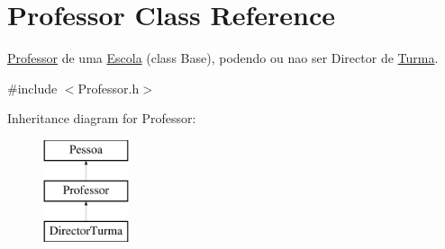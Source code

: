 \hypertarget{class_professor}{\section{Professor Class Reference}
\label{class_professor}
}


\hyperlink{class_professor}{Professor} de uma \hyperlink{class_escola}{Escola} (class Base), podendo ou nao ser Director de \hyperlink{class_turma}{Turma}.  




{\ttfamily \#include $<$Professor.\-h$>$}

Inheritance diagram for Professor\-:\begin{figure}[H]
\begin{center}
\leavevmode
\includegraphics[height=3.000000cm]{class_professor}
\end{center}
\end{figure}

